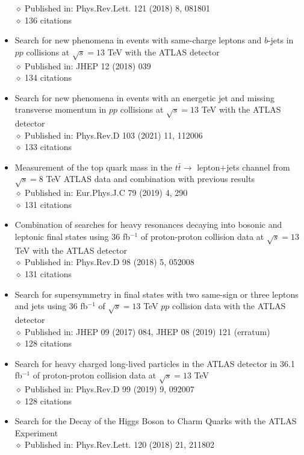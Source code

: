 \documentclass[margin, 10pt]{res} %
\begin{document}
\begin{resume}
\begin{itemize}
$\diamond$ Published in: Phys.Rev.Lett. 121 (2018) 8, 081801\\
$\diamond$ 136 citations
\item Search for new phenomena in events with same-charge leptons and $b$-jets in $pp$ collisions at $\sqrt{s} = 13$ TeV with the ATLAS detector\\
$\diamond$ Published in: JHEP 12 (2018) 039\\
$\diamond$ 134 citations
\item Search for new phenomena in events with an energetic jet and missing transverse momentum in $pp$ collisions at $\sqrt{s} = 13$ TeV with the ATLAS detector\\
$\diamond$ Published in: Phys.Rev.D 103 (2021) 11, 112006\\
$\diamond$ 133 citations
\item Measurement of the top quark mass in the $t\bar{t} \rightarrow$ lepton+jets channel from $\sqrt{s} = 8$ TeV ATLAS data and combination with previous results\\
$\diamond$ Published in: Eur.Phys.J.C 79 (2019) 4, 290\\
$\diamond$ 131 citations
\item Combination of searches for heavy resonances decaying into bosonic and leptonic final states using 36 fb$^{-1}$ of proton-proton collision data at $\sqrt{s} = 13$ TeV with the ATLAS detector\\
$\diamond$ Published in: Phys.Rev.D 98 (2018) 5, 052008\\
$\diamond$ 131 citations
\item Search for supersymmetry in final states with two same-sign or three leptons and jets using 36 fb$^{-1}$ of $\sqrt{s} = 13$ TeV $pp$ collision data with the ATLAS detector\\
$\diamond$ Published in: JHEP 09 (2017) 084, JHEP 08 (2019) 121 (erratum)\\
$\diamond$ 128 citations
\item Search for heavy charged long-lived particles in the ATLAS detector in 36.1 fb$^{-1}$ of proton-proton collision data at $\sqrt{s} = 13$ TeV\\
$\diamond$ Published in: Phys.Rev.D 99 (2019) 9, 092007\\
$\diamond$ 128 citations
\item Search for the Decay of the Higgs Boson to Charm Quarks with the ATLAS Experiment\\
$\diamond$ Published in: Phys.Rev.Lett. 120 (2018) 21, 211802\\

\end{itemize}
\end{resume}
\end{document}
